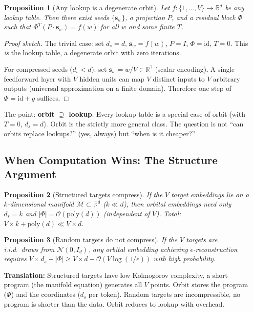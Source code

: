 \documentclass[11pt, a4paper]{article}
\newcommand{\s}{\mathbf{s}}
\newcommand{\R}{\mathbb{R}}
\newcommand{\calM}{\mathcal{M}}
\newcommand{\calO}{\mathcal{O}}
\newtheorem{proposition}{Proposition}
\theoremstyle{remark}
\begin{document}
\begin{proposition}[Any lookup is a degenerate orbit]\label{prop:universal}
Let $f: \{1, \ldots, V\} \to \R^d$ be any lookup table.
Then there exist seeds $\{\s_w\}$, a projection $P$, and a residual block $\Phi$
such that $\Phi^T(P \cdot \s_w) = f(w)$ for all $w$ and some finite $T$.
\end{proposition}

\begin{proof}[Proof sketch]
The trivial case: set $d_s = d$, $\s_w = f(w)$, $P = I$, $\Phi = \text{id}$, $T = 0$.
This \emph{is} the lookup table, a degenerate orbit with zero iterations.

For compressed seeds ($d_s < d$): set $\s_w = w/V \in \R^1$ (scalar encoding).
A single feedforward layer with $V$ hidden units can map $V$ distinct inputs
to $V$ arbitrary outputs (universal approximation on a finite domain).
Therefore one step of $\Phi = \text{id} + g$ suffices.
\end{proof}

The point: \textbf{orbit $\supseteq$ lookup}.
Every lookup table is a special case of orbit (with $T{=}0$, $d_s{=}d$).
Orbit is the strictly more general class.
The question is not ``can orbits replace lookups?'' (yes, always) but ``when is it cheaper?''

\subsection{When Computation Wins: The Structure Argument}

\begin{proposition}[Structured targets compress]\label{prop:structure}
If the $V$ target embeddings lie on a $k$-dimensional manifold $\calM \subset \R^d$ ($k \ll d$),
then orbital embeddings need only $d_s = k$ and $|\Phi| = \calO(\text{poly}(d))$
(independent of $V$).
Total: $V \times k + \text{poly}(d) \ll V \times d$.
\end{proposition}

\begin{proposition}[Random targets do not compress]\label{prop:incompress}
If the $V$ targets are i.i.d.\ draws from $\mathcal{N}(0, I_d)$,
any orbital embedding achieving $\epsilon$-reconstruction requires
$V \times d_s + |\Phi| \geq V \times d - \calO(V \log(1/\epsilon))$
with high probability.
\end{proposition}

\noindent
\textbf{Translation:}
Structured targets have low Kolmogorov complexity, a short program (the manifold equation)
generates all $V$ points.
Orbit stores the program ($\Phi$) and the coordinates ($d_s$ per token).
Random targets are incompressible, no program is shorter than the data.
Orbit reduces to lookup with overhead.
\end{document}
